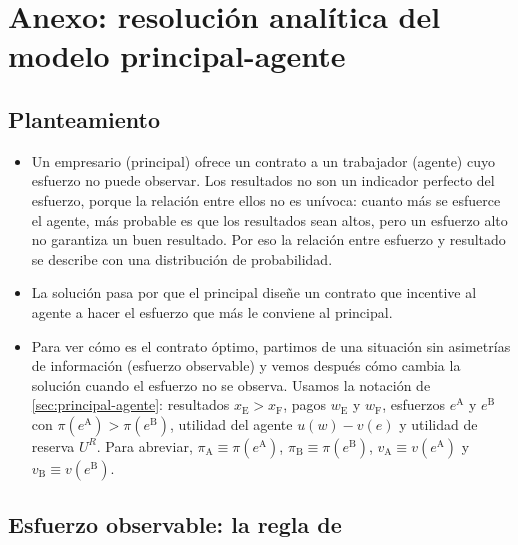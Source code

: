 \documentclass[11pt]{article}
\begin{document}
\clearpage
\appendix

\section{Anexo: resolución analítica del modelo principal-agente}\label{anexo:principal-agente}

\subsection{Planteamiento}\label{anexo:pa-planteamiento}

\begin{itemize}
\item Un empresario (principal) ofrece un contrato a un trabajador (agente) cuyo esfuerzo no puede observar. Los resultados no son un indicador perfecto del esfuerzo, porque la relación entre ellos no es unívoca: cuanto más se esfuerce el agente, más probable es que los resultados sean altos, pero un esfuerzo alto no garantiza un buen resultado. Por eso la relación entre esfuerzo y resultado se describe con una distribución de probabilidad.
\item La solución pasa por que el principal diseñe un contrato que incentive al agente a hacer el esfuerzo que más le conviene al principal.
\item Para ver cómo es el contrato óptimo, partimos de una situación sin asimetrías de información (esfuerzo observable) y vemos después cómo cambia la solución cuando el esfuerzo no se observa. Usamos la notación de \ref{sec:principal-agente}: resultados $x_{\mathrm{E}}>x_{\mathrm{F}}$, pagos $w_{\mathrm{E}}$ y $w_{\mathrm{F}}$, esfuerzos $e^{\mathrm{A}}$ y $e^{\mathrm{B}}$ con $\pi(e^{\mathrm{A}})>\pi(e^{\mathrm{B}})$, utilidad del agente $u(w)-v(e)$ y utilidad de reserva $U^R$. Para abreviar, $\pi_{\mathrm{A}}\equiv\pi(e^{\mathrm{A}})$, $\pi_{\mathrm{B}}\equiv\pi(e^{\mathrm{B}})$, $v_{\mathrm{A}}\equiv v(e^{\mathrm{A}})$ y $v_{\mathrm{B}}\equiv v(e^{\mathrm{B}})$.
\end{itemize}

\subsection{Esfuerzo observable: la regla de }\label{anexo:pa-borch}
\end{document}

